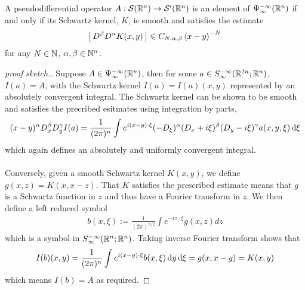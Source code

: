 \documentclass[12pt]{article}
\begin{document}
\begin{fprop}
    A pseudodifferential operator $A : \sch(\R^n) \to \sch'(\R^n)$ is an element of $\Psi^{-\infty}_{\infty}(\R^n)$ if and only if its Schwartz kernel, $K$, is smooth and satisfies the estimate
    \begin{align*}
    \abs{D^\beta D^\alpha K(x, y)} \leq C_{N, \alpha, \beta} \sym[x - y]^{-N}
    \end{align*}
    for any $N \in \N$, $\alpha, \beta \in \N^n$. 
\end{fprop}
\begin{proof}[proof sketch.] 
    Suppose $A \in \Psi^{-\infty}_{\infty}(\R^n)$, then for some $a \in S^{-\infty}_\infty(\R^{2n}; \R^n)$, $I(a) = A$, with the Schwartz kernel $I(a) = I(a)(x, y)$ represented by an absolutely convergent integral. The Schwartz kernel can be shown to be smooth and satisfies the precribed esitmates using integration by parts, 
    \begin{align*}
    (x - y)^\alpha D^\beta_x D^\gamma_y I(a) = \frac{1}{(2\pi)^n} \int e^{i(x - y) \cdot \xi} (-D_\xi)^\alpha (D_x + i\xi)^\beta (D_y - i\xi)^\gamma  a(x, y, \xi) \d[\xi]
    \end{align*}
    which again defines an absolutely and uniformly convergent integral. \\
    \\
    Conversely, given a smooth Schwartz kernel $K(x, y)$, we define $g(x, z) = K(x, x - z)$. That $K$ satisfies the prescribed estimate means that $g$ is a Schwartz function in $z$ and thus have a Fourier transform in $z$. We then define a left reduced symbol
    \begin{align*}
    b(x, \xi) := \frac{1}{(2\pi)^{n/2}} \int e^{- i z \cdot \xi} g(x, z) dz 
    \end{align*}
    which is a symbol in $S^{-\infty}_\infty(\R^{n}; \R^n)$. Taking inverse Fourier transform shows that
    \begin{align*}
    I(b)(x, y) = \frac{1}{(2\pi)^n} \int e^{i(x - y) \cdot \xi} b(x, \xi) \d[y] \d[\xi] = g(x, x - y) = K(x, y)
    \end{align*}
    which means $I(b) = A$ as required. 

\end{proof}
\end{document}

